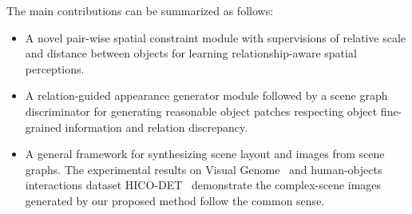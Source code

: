 The main contributions can be summarized as follows:
\begin{itemize}%
\item A novel pair-wise spatial constraint module with supervisions of relative scale and distance between objects for learning relationship-aware spatial perceptions. 
\item A relation-guided appearance generator module followed by a scene graph discriminator for generating reasonable object patches respecting object fine-grained information and relation discrepancy.
\item A general framework for synthesizing scene layout and images from scene graphs. The experimental results on Visual Genome~\cite{krishna2017visual} and human-objects interactions dataset HICO-DET~\cite{chao2018learning} demonstrate the complex-scene images generated by our proposed method follow the common sense.%
\end{itemize}

